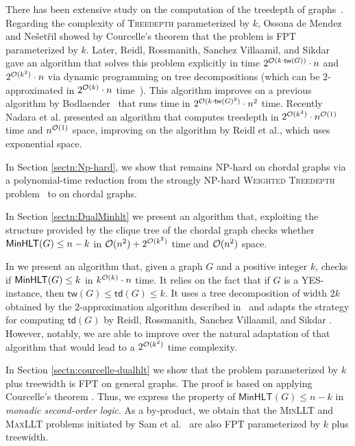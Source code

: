 \documentclass[a4paper,11pt]{article}
\begin{document}
There has been extensive study on the computation of the treedepth of graphs~\cite{HansBod1998,HansBodGHT1995,FominGS2013,kobayashiTamaki2016}.
%
Regarding the complexity of \textsc{Treedepth} parameterized by $k$, Ossona de Mendez and Nešetřil showed by Courcelle's theorem that the problem is FPT parameterized by $k$. Later, Reidl, Rossmanith, Sanchez Villaamil, and Sikdar \cite{Reidl14} gave an algorithm that solves this problem explicitly in time $2^{{\mathcal{O}}(k\cdot\mathsf{tw}(G))} \cdot n$ and $2^{{\mathcal{O}}(k^2)} \cdot n$ via dynamic programming on tree decompositions (which can be $2$-approximated in $2^{{\mathcal{O}}(k)}\cdot n$ time~\cite{Korhonen21}). This algorithm improves on a previous algorithm by Bodlaender~\cite{HansBod1998} that runs time in $2^{{\mathcal{O}}(k\cdot\mathsf{tw}(G)^2)} \cdot n^2$ time.
%
Recently Nadara et al. \cite{Nadara22} presented an algorithm that computes treedepth in $2^{{\mathcal{O}}(k^2)} \cdot n^{{\mathcal{O}}(1)}$ time and $n^{{\mathcal{O}}(1)}$ space, improving on the algorithm by Reidl et al., which uses exponential space.


In Section \ref{sectn:Np-hard}, we show that \MinHProb remains NP-hard on chordal graphs via a polynomial-time reduction from the strongly NP-hard \textsc{Weighted Treedepth} problem~\cite{ipl2006} to \MinHProb on chordal graphs. 


In Section \ref{sectn:DualMinhlt} we present an algorithm that, exploiting the structure provided by the clique tree of the chordal graph checks whether $\mathsf{MinHLT}(G) \le n-k$ in ${\mathcal{O}}(n^2) + 2^{{\mathcal{O}}(k^2)}$ time and ${\mathcal{O}}(n^2)$ space. 

In  we present an algorithm that, given a graph $G$ and a positive integer $k$, checks if $\mathsf{MinHLT}(G) \le k$ in $k^{{\mathcal{O}}(k)} \cdot n$ time.  It relies on the fact that if $G$ is a YES-instance, then $\mathsf{tw}(G) \le \mathsf{td}(G) \le k$. It uses a tree decomposition of width $2k$ obtained by the $2$-approximation algorithm described in~\cite{Korhonen21} and adapts the strategy for computing $\mathsf{td}(G)$ by Reidl, Rossmanith, Sanchez Villaamil, and Sikdar \cite{Reidl14}. However, notably, we are able to improve over the natural adaptation of that algorithm that would lead to a $2^{{\mathcal{O}}(k^2)}$ time complexity.
%

In Section \ref{sectn:courcelle-dualhlt}
we show that the \DualMinHProb problem parameterized by $k$ plus treewidth is FPT on general graphs. The proof is based on applying Courcelle's theorem  \cite{Courcelle90}. Thus, we express the property of $\mathsf{MinHLT}(G) \le n-k$ in \textit{monadic second-order logic}. As a by-product, we obtain that the \textsc{MinLLT} and \textsc{MaxLLT} problems initiated by Sam et al.~\cite{SamFRG23} are also FPT parameterized by $k$ plus treewidth.
\end{document}
